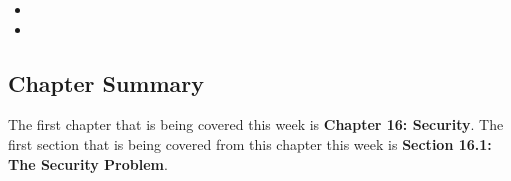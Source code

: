 \begin{itemize}
    \item {}
    \item {}
\end{itemize}

\newpage

\subsection{Chapter Summary}

The first chapter that is being covered this week is \textbf{Chapter 16: Security}. The first section that is being covered from this chapter this week is \textbf{Section 16.1: The Security Problem}.


